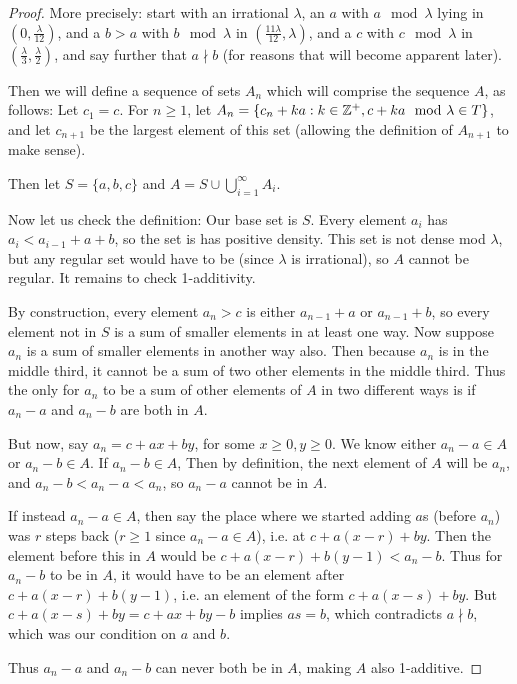 \documentclass{report}
\theoremstyle{remark}
\numberwithin{equation}{section}
\begin{document}
\begin{proof}
  More precisely: start with an irrational $\lambda$, an $a$ with
  $a \mod{\lambda}$ lying in $(0, \frac{\lambda}{12})$, and a $b > a$
  with $b \mod{\lambda}$ in $(\frac{11\lambda}{12},\lambda)$, and a
  $c$ with $c \mod{\lambda}$ in $(\frac\lambda 3, \frac\lambda 2)$,
  and say further that $a \nmid b$ (for reasons that will become
  apparent later).

  Then we will define a sequence of sets $A_n$ which will comprise the
  sequence $A$, as follows: Let $c_1 = c$.  For $n \geq 1$, let
  $A_n = \{c_n + ka : k \in \mathbb{Z}^+, c+ka\mod{\lambda} \in T\}$, and let
  $c_{n+1}$ be the largest element of this set (allowing the
  definition of $A_{n+1}$ to make sense).  

  Then let $S = \{a, b, c\}$ and $A = S \cup \bigcup_{i=1}^\infty
  A_i$.  

  Now let us check the definition: Our base set is $S$.  Every element
  $a_i$ has $a_i < a_{i-1} + a + b$, so the set is has positive
  density.  This set is not dense mod $\lambda$, but any regular set
  would have to be (since $\lambda$ is irrational), so $A$ cannot be
  regular.  It remains to check 1-additivity.  

  By construction, every element $a_n > c$ is either $a_{n-1} + a$ or
  $a_{n-1}+b$, so every element not in $S$ is a sum of smaller
  elements in at least one way.  Now suppose $a_n$ is a sum of smaller
  elements in another way also.  Then because $a_n$ is in the middle
  third, it cannot be a sum of two other elements in the middle third.
  Thus the only for $a_n$ to be a sum of other elements of $A$ in two
  different ways is if $a_n - a$ and $a_n - b$ are both in $A$.  

  But now, say $a_n = c + ax + by$, for some $x \geq 0, y \geq 0$.
  We know either $a_n - a \in A$ or $a_n - b \in A$.  If $a_n - b \in
  A$, Then by definition, the next element of $A$ will be $a_n$, and
  $a_n - b < a_n - a < a_n$, so $a_n - a$ cannot be in $A$.  

  If instead $a_n - a \in A$, then say the place where we started
  adding $a$s (before $a_n$) was $r$ steps back ($r \geq 1$ since
  $a_n - a \in A$), i.e. at $c + a(x-r) + by$.  Then the element
  before this in $A$ would be $c + a(x-r) + b(y-1) < a_n - b$.  Thus
  for $a_n - b$ to be in $A$, it would have to be an element after
  $c + a(x-r) + b(y-1)$, i.e. an element of the form
  $c + a(x-s) + by$.  But $c + a(x-s) + by = c + ax + by - b$ implies
  $as = b$, which contradicts $a \nmid b$, which was our condition on
  $a$ and $b$.  

  Thus $a_n - a$ and $a_n - b$ can never both be in $A$, making $A$
  also 1-additive.
\end{proof}
\end{document}
